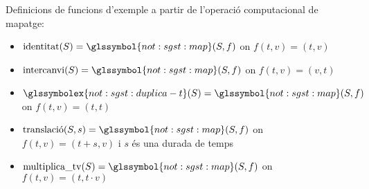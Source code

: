\begin{example}
  Definicions de funcions d'exemple a partir de l'operació
  computacional de mapatge:

\label{ex:sgst:duplicat}
\begin{itemize}
\item $\operatorname{identitat}(S)= \glssymbol{not:sgst:map}(S,f)$ on
  $f(t,v)=(t,v)$
\item $\operatorname{intercanvi}(S)=
  \glssymbol{not:sgst:map}(S,f)$ on $f(t,v)=(v,t)$
\item $\glssymbolex{not:sgst:duplica-t}(S)=
  \glssymbol{not:sgst:map}(S,f)$ on $f(t,v)=(t,t)$
\item $\operatorname{translaci\acute{o}}(S,s)=
  \glssymbol{not:sgst:map}(S,f)$ on $f(t,v)=(t+s,v)$ i $s$ és una
  durada de temps
\item $\operatorname{multiplica\_tv}(S)=
  \glssymbol{not:sgst:map}(S,f)$ on $f(t,v)=(t,t\cdot v)$


\end{itemize}
\end{example}

